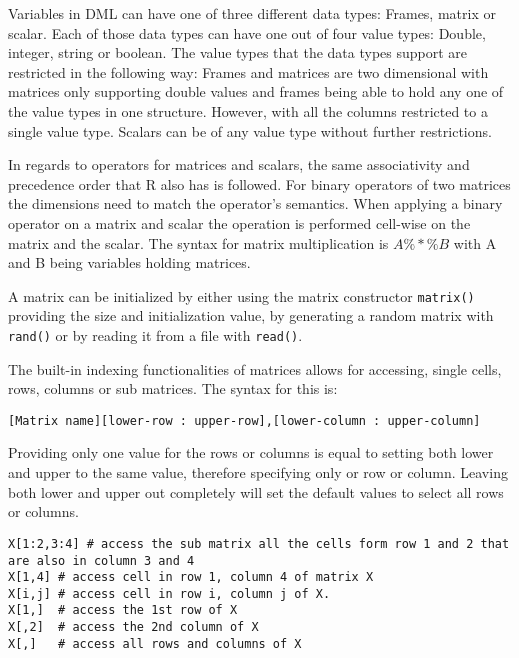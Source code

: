 Variables in \acs{DML} can have one of three different data types: Frames, matrix or scalar. Each of those data types can have one out of four value types:  Double, integer, string or boolean.
The value types that the data types support are restricted in the following way:
Frames and matrices are two dimensional with matrices only supporting double values and frames being able to hold any one of the value types in one structure. However, with all the columns restricted to a single value type. Scalars can be of any value type without further restrictions.

In regards to operators for matrices and scalars, the same associativity and precedence order that R also has is followed.
For binary operators of two matrices the dimensions need to match the operator's semantics. When applying a binary operator on a matrix and scalar the operation is performed cell-wise on the matrix and the scalar. The syntax for matrix multiplication is $A \% *\% B$ with A and B being variables holding matrices.

A matrix can be initialized by either using the matrix constructor \lstinline{matrix()} providing the size and initialization value, by generating a random matrix with  \lstinline{rand()} or by reading it from a file with \lstinline{read()}.

The built-in indexing functionalities of matrices allows for accessing, single cells, rows, columns or sub matrices. The syntax for this is:

\begin{lstlisting}[caption={Matrix range indexing syntax},captionpos=b]
[Matrix name][lower-row : upper-row],[lower-column : upper-column]
\end{lstlisting}

Providing only one value for the rows or columns is equal to setting both lower and upper to the same value, therefore specifying only or row or column. Leaving both lower and upper out completely will set the default values to select all rows or columns. 


\begin{lstlisting}[caption={Example for matrix indexing},captionpos=b]
X[1:2,3:4] # access the sub matrix all the cells form row 1 and 2 that are also in column 3 and 4
X[1,4] # access cell in row 1, column 4 of matrix X
X[i,j] # access cell in row i, column j of X.
X[1,]  # access the 1st row of X 
X[,2]  # access the 2nd column of X
X[,]   # access all rows and columns of X
\end{lstlisting}

